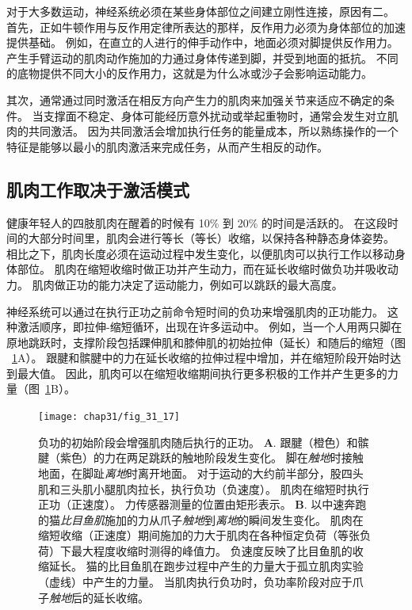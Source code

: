 对于大多数运动，神经系统必须在某些身体部位之间建立刚性连接，原因有二。
首先，正如牛顿作用与反作用定律所表达的那样，反作用力必须为身体部位的加速提供基础。
例如，在直立的人进行的伸手动作中，地面必须对脚提供反作用力。
产生手臂运动的肌肉动作施加的力通过身体传递到脚，并受到地面的抵抗。
不同的底物提供不同大小的反作用力，这就是为什么冰或沙子会影响运动能力。


其次，通常通过同时激活在相反方向产生力的肌肉来加强关节来适应不确定的条件。
当支撑面不稳定、身体可能经历意外扰动或举起重物时，通常会发生对立肌肉的共同激活。
因为共同激活会增加执行任务的能量成本，所以熟练操作的一个特征是能够以最小的肌肉激活来完成任务，从而产生相反的动作。



\subsection{肌肉工作取决于激活模式}

健康年轻人的四肢肌肉在醒着的时候有 10\% 到 20\% 的时间是活跃的。
在这段时间的大部分时间里，肌肉会进行等长（等长）收缩，以保持各种静态身体姿势。
相比之下，肌肉长度必须在运动过程中发生变化，以便肌肉可以执行工作以移动身体部位。
肌肉在缩短收缩时做正功并产生动力，而在延长收缩时做负功并吸收动力。
肌肉做正功的能力决定了运动能力，例如可以跳跃的最大高度。


神经系统可以通过在执行正功之前命令短时间的负功来增强肌肉的正功能力。
这种激活顺序，即拉伸-缩短循环，出现在许多运动中。 
例如，当一个人用两只脚在原地跳跃时，支撑阶段包括踝伸肌和膝伸肌的初始拉伸（延长）和随后的缩短（图 ~\ref{fig:31_17}A）。
跟腱和髌腱中的力在延长收缩的拉伸过程中增加，并在缩短阶段开始时达到最大值。
因此，肌肉可以在缩短收缩期间执行更多积极的工作并产生更多的力量（图~\ref{fig:31_17}B）。


\begin{figure}[htbp]
	\centering
	\texttt{[image: chap31/fig\_31\_17]}
	\caption{负功的初始阶段会增强肌肉随后执行的正功\cite{finni2000vivo,gregor1988mechanical}。
	\textbf{A}. 跟腱（橙色）和髌腱（紫色）的力在两足跳跃的触地阶段发生变化。
	脚在\textit{触地}时接触地面，在脚趾\textit{离地}时离开地面。
	对于运动的大约前半部分，股四头肌和三头肌小腿肌肉拉长，执行负功（负速度）。
	肌肉在缩短时执行正功（正速度）。
	力传感器测量的位置由矩形表示。
	\textbf{B}. 以中速奔跑的猫\textit{比目鱼肌}施加的力从爪子\textit{触地}到\textit{离地}的瞬间发生变化。
	肌肉在缩短收缩（正速度）期间施加的力大于肌肉在各种恒定负荷（等张负荷）下最大程度收缩时测得的峰值力。
	负速度反映了比目鱼肌的收缩延长。
	猫的比目鱼肌在跑步过程中产生的力量大于孤立肌肉实验（虚线）中产生的力量。
	当肌肉执行负功时，负功率阶段对应于爪子\textit{触地}后的延长收缩。}
	\label{fig:31_17}
\end{figure}


